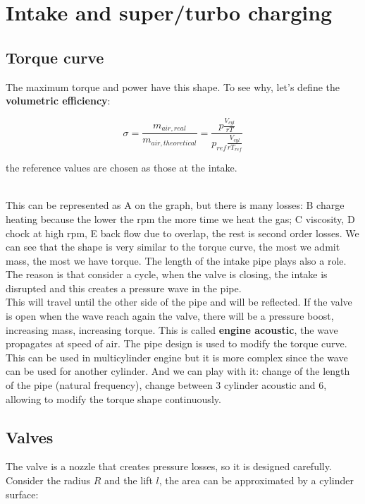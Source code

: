 
\chapter{Intake and super/turbo charging}
\section{Torque curve}
	The maximum torque and power have this shape. To see why, let's define the \textbf{volumetric efficiency}: 
	
	\begin{equation}
	\sigma = \frac{m_{air,real}}{m_{air,theoretical}} = \frac{p \frac{V_{cyl}}{rT}}{p_{ref} \frac{V_{cyl}}{rT_{ref}}}
	\label{eq:7.1}
	\end{equation}
	
	the reference values are chosen as those at the intake. 
	
	\ \\
	
	This can be represented as A on the graph, but there is many losses: B charge heating because the lower the rpm the more time we heat the gas; C viscosity, D chock at high rpm, E back flow due to overlap, the rest is second order losses. We can see that the shape is very similar to the torque curve, the most we admit mass, the most we have torque. The length of the intake pipe plays also a role. The reason is that consider a cycle, when the valve is closing, the intake is disrupted and this creates a pressure wave in the pipe.
	\ \\
	
	 This will travel until the other side of the pipe and will be reflected. If the valve is open when the wave reach again the valve, there will be a pressure boost, increasing mass, increasing torque. This is called \textbf{engine acoustic}, the wave propagates at speed of air. The pipe design is used to modify the torque curve. This can be used in multicylinder engine but it is more complex since the wave can be used for another cylinder. And we can play with it: change of the length of the pipe (natural frequency), change between 3 cylinder acoustic and 6, allowing to modify the torque shape continuously. 
	 
\section{Valves}
	The valve is a nozzle that creates pressure losses, so it is designed carefully. Consider the radius $R$ and the lift $l$, the area can be approximated by a cylinder surface: 
	
